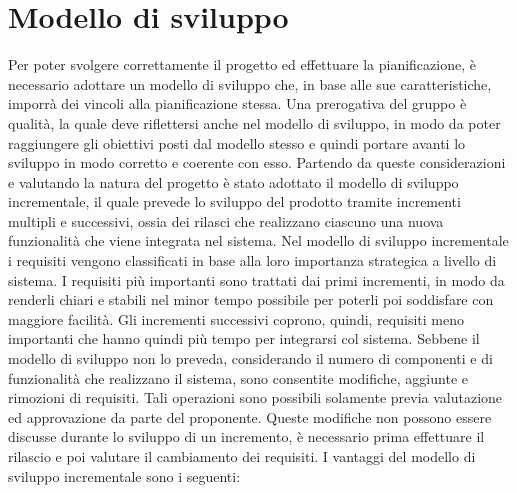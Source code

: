 \section{Modello di sviluppo}
	Per poter svolgere correttamente il progetto ed effettuare la pianificazione, è necessario adottare un modello di sviluppo che, in base alle sue caratteristiche, imporrà dei vincoli alla pianificazione stessa. Una prerogativa del gruppo è qualità, la quale deve riflettersi anche nel modello di sviluppo, in modo da poter raggiungere gli obiettivi posti dal modello stesso e quindi portare avanti lo sviluppo in modo corretto e coerente con esso.
	\newline
	Partendo da queste considerazioni e valutando la natura del progetto è stato adottato il modello di sviluppo incrementale, il quale prevede lo sviluppo del prodotto tramite incrementi multipli e successivi, ossia dei rilasci che realizzano ciascuno una nuova funzionalità che viene integrata nel sistema.
	\newline
	Nel modello di sviluppo incrementale i requisiti vengono classificati in base alla loro importanza strategica a livello di sistema. I requisiti più importanti sono trattati dai primi incrementi, in modo da renderli chiari e stabili nel minor tempo possibile per poterli poi soddisfare con maggiore facilità. Gli incrementi successivi coprono, quindi, requisiti meno importanti che hanno quindi più tempo per integrarsi col sistema.
	\newline
	Sebbene il modello di sviluppo non lo preveda, considerando il numero di componenti e di funzionalità che realizzano il sistema, sono consentite modifiche, aggiunte e rimozioni di requisiti. Tali operazioni sono possibili solamente previa valutazione ed approvazione da parte del proponente. Queste modifiche non possono essere discusse durante lo sviluppo di un incremento, è necessario prima effettuare il rilascio e poi valutare il cambiamento dei requisiti.
	\newline
	I vantaggi del modello di sviluppo incrementale sono i seguenti:
